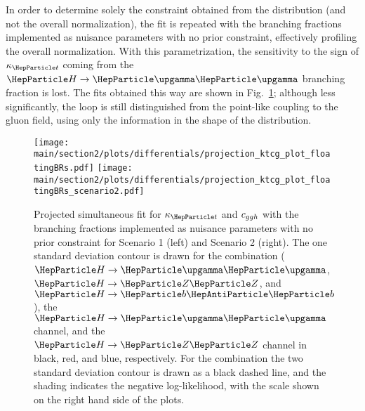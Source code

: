 In order to determine solely the constraint obtained from the distribution (and not the overall normalization), the fit is repeated with the branching fractions implemented as nuisance parameters with no prior constraint, effectively profiling the overall normalization.
% 
With this parametrization, the sensitivity to the sign of $\kappat$ coming from the $\hgg$ branching fraction is lost.
% 
The fits obtained this way are shown in Fig.~\ref{fig:ktcg_couplingdependentBRs}; although less significantly, the loop is still distinguished from the point-like coupling to the gluon field, using only the information in the shape of the distribution.

\begin{figure}[hbtp]
  \begin{center}
    \texttt{[image: \\main/section2/plots/differentials/projection\_ktcg\_plot\_floatingBRs.pdf]}
    \texttt{[image: \\main/section2/plots/differentials/projection\_ktcg\_plot\_floatingBRs\_scenario2.pdf]}
    \caption{
        Projected simultaneous fit for $\kappat$ and $c_{ggh}$ with the branching fractions implemented as nuisance parameters with no prior constraint for Scenario 1 (left) and Scenario 2 (right).
        The one standard deviation contour is drawn for the combination ($\hgg$, $\hzz$, and $\hbb$), the $\hgg$ channel, and the $\hzz$ channel in black, red, and blue, respectively.
        For the combination the two standard deviation contour is drawn as a black dashed line, and the shading indicates the negative log-likelihood, with the scale shown on the right hand side of the plots.
        }
    \label{fig:ktcg_couplingdependentBRs}
  \end{center}
\end{figure}


